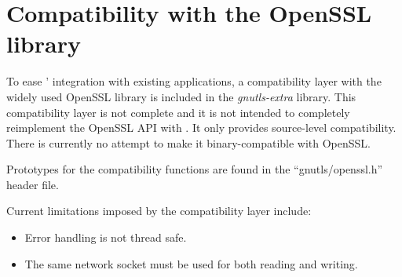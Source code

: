 \section{Compatibility with the OpenSSL library}

To ease \gnutls{}' integration with existing applications, a compatibility 
layer with the widely used OpenSSL library is included in the \emph{gnutls-extra}
library. This compatibility layer is not complete and it is not 
intended to completely reimplement the OpenSSL API with \gnutls{}.
It only provides source-level compatibility. There is currently no
attempt to make it binary-compatible with OpenSSL.

Prototypes for the compatibility functions are found in the 
``gnutls/openssl.h'' header file.

Current limitations imposed by the compatibility layer include:

\begin{itemize}

\item Error handling is not thread safe.

\item The same network socket must be used for both reading and writing.

\end{itemize}

